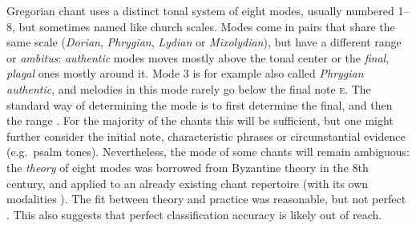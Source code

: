 \documentclass{article}
\begin{document}
Gregorian chant uses a distinct tonal system of eight modes, usually numbered 1--8, but sometimes named like church scales.
Modes come in pairs that share the same scale (\emph{Dorian}, \emph{Phrygian}, \emph{Lydian} or \emph{Mixolydian}), but have a different range or \emph{ambitus}: \emph{authentic} modes moves mostly above the tonal center or the \emph{final}, \emph{plagal} ones mostly around it.
Mode 3 is for example also called \emph{Phrygian authentic}, and melodies in this mode rarely go below the final note \textsc{e}.
The standard way of determining the mode is to first determine the final, and then the range \cite{Hiley2009}. 
For the majority of the chants this will be sufficient, but one might further consider the initial note, characteristic phrases or circumstantial evidence (e.g.~psalm tones).
Nevertheless, the mode of some chants will remain ambiguous: the \emph{theory} of eight modes was borrowed from Byzantine theory in the 8th century, and applied to an already existing chant repertoire (with its own modalities \cite{Wiering2006}).
The fit between theory and practice was reasonable, but not perfect \cite{Powers2001}.
This also suggests that perfect classification accuracy is likely out of reach.
\end{document}
